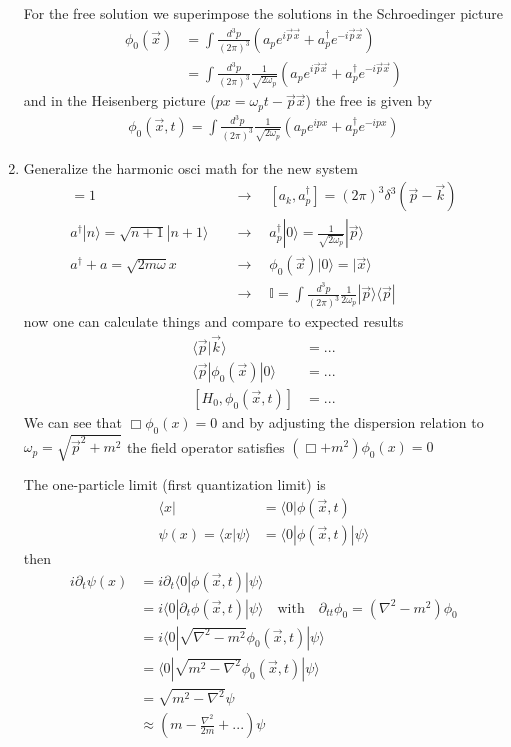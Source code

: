\documentclass[10pt,a4paper]{book}
\theoremstyle{definition}
\begin{document}
\begin{enumerate}
For the free solution we superimpose the solutions in the Schroedinger picture
\begin{align}
\phi_0(\vec{x})
&=\int\frac{d^3p}{(2\pi)^3}\left(a_pe^{i\vec{p}\vec{x}}+a_p^\dagger e^{-i\vec{p}\vec{x}}\right)\\
&=\int\frac{d^3p}{(2\pi)^3}\frac{1}{\sqrt{2\omega_p}}\left(a_pe^{i\vec{p}\vec{x}}+a_p^\dagger e^{-i\vec{p}\vec{x}}\right)
\end{align}
and in the Heisenberg picture ($px=\omega_pt-\vec{p}\vec{x}$) the free is given by
\begin{align}
\phi_0(\vec{x},t)
=\int\frac{d^3p}{(2\pi)^3}\frac{1}{\sqrt{2\omega_p}}\left(a_pe^{ipx}+a_p^\dagger e^{-ipx}\right)
\end{align}

\item Generalize the harmonic osci math for the new system
\begin{align}
[a,a^\dagger]=1\quad &\rightarrow\quad[a_k,a_p^\dagger]=(2\pi)^3\delta^3(\vec{p}-\vec{k})\\
a^\dagger|n\rangle=\sqrt{n+1}|n+1\rangle\quad&\rightarrow\quad a_p^\dagger|0\rangle=\frac{1}{\sqrt{2\omega_p}}|\vec{p}\rangle\\
a^\dagger+a=\sqrt{2m\omega}x\quad&\rightarrow\quad\phi_0(\vec{x})|0\rangle=|\vec{x}\rangle\\
&\rightarrow\quad \mathbb{I}=\int\frac{d^3p}{(2\pi)^3}\frac{1}{2\omega_p}|\vec{p}\rangle\langle\vec{p}|
\end{align}
now one can calculate things and compare to expected results
\begin{align}
\langle\vec{p}|\vec{k}\rangle&=...\\
\langle\vec{p}|\phi_0(\vec{x})|0\rangle&=...\\
[H_0,\phi_0(\vec{x},t)]&=...
\end{align}
We can see that $\Box\phi_0(x)=0$ and by adjusting the dispersion relation to $\omega_p=\sqrt{\vec{p}^2+m^2}$ the field operator satisfies $(\Box+m^2)\phi_0(x)=0$

The one-particle limit (first quantization limit) is
\begin{align}
\langle x|&=\langle0|\phi(\vec{x},t)\\
\psi(x)=\langle x|\psi\rangle&=\langle0|\phi(\vec{x},t)|\psi\rangle
\end{align}
then
\begin{align}
i\partial_t\psi(x)
&=i\partial_t\langle0|\phi(\vec{x},t)|\psi\rangle\\
&=i\langle0|\partial_t\phi(\vec{x},t)|\psi\rangle\quad\text{with}\quad \partial_{tt}\phi_0=(\nabla^2-m^2)\phi_0\\
&=i\langle0|\sqrt{\nabla^2-m^2}\phi_0(\vec{x},t)|\psi\rangle\\
&=\langle0|\sqrt{m^2-\nabla^2}\phi_0(\vec{x},t)|\psi\rangle\\
&=\sqrt{m^2-\nabla^2}\psi\\
&\approx \left(m-\frac{\nabla^2}{2m}+...\right)\psi
\end{align}



\end{enumerate}
\end{document}
